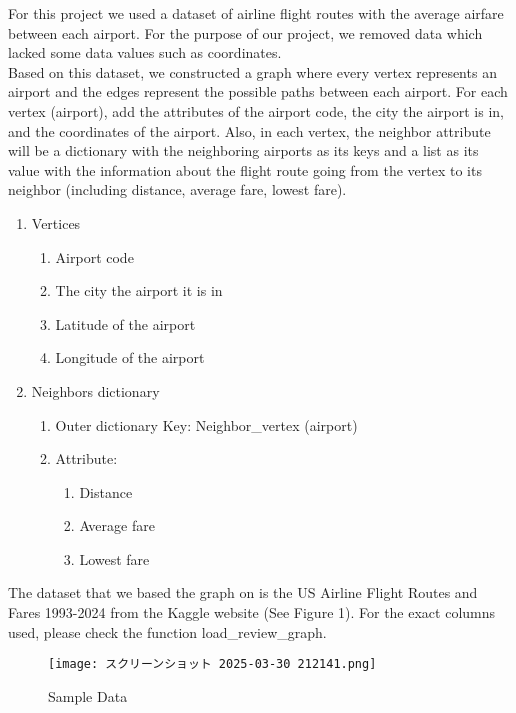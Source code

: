 \documentclass[fontsize=11pt]{article}
\begin{document}
For this project we used a dataset of airline flight routes with the average airfare between each airport. For the purpose of our project, we removed data which lacked some data values such as coordinates.\\

Based on this dataset, we constructed a graph where every vertex represents an airport and the edges represent the possible paths between each airport. For each vertex (airport), add the attributes of the airport code, the city the airport is in, and the coordinates of the airport. Also, in each vertex, the neighbor attribute will be a dictionary with the neighboring airports as its keys and a list as its value with the information about the flight route going from the vertex to its neighbor (including distance, average fare, lowest fare).  \\
\newpage
\begin{enumerate}
    \item Vertices
    \begin{enumerate}
        \item Airport code
        \item The city the airport it is in
        \item Latitude of the airport
        \item Longitude of the airport
    \end{enumerate}
    \item Neighbors dictionary
    \begin{enumerate}
        \item Outer dictionary Key: Neighbor\_vertex (airport)
        \item Attribute: 
        \begin{enumerate}
            \item Distance
            \item Average fare
            \item Lowest fare
        \end{enumerate}
    \end{enumerate}
\end{enumerate}

The dataset that we based the graph on is the US Airline Flight Routes and Fares 1993-2024 from the Kaggle website (See Figure 1). For the exact columns used, please check the function load\_review\_graph.\\

\begin{figure}
    \centering
    \texttt{[image: スクリーンショット 2025-03-30 212141.png]}
    \caption{Sample Data}
    \label{fig:enter-label}
\end{figure}
\end{document}
